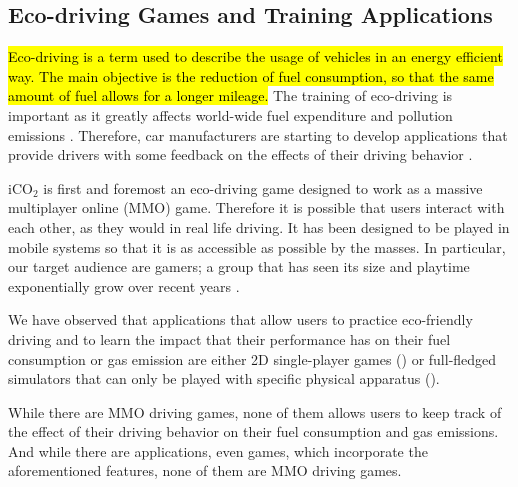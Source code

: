 \documentclass[preprint,authoryear,12pt]{elsarticle}
\newcommand{\hlc}[2][yellow]{ {\sethlcolor{#1} \hl{#2}} }
\newcommand{\commentHidden}[1]{}  %
\newcommand{\commentShow}[1] {} %
\begin{document}
\subsection{Eco-driving Games and Training Applications}
\label{subsec:eco-driving}

\hlc[green]{
Eco-driving is a term used to describe the usage of vehicles in an energy efficient way. The main objective is the reduction of fuel consumption, so that the same amount of fuel allows for a longer mileage.
} \commentShow{Used to describe where ? In this paper ? In some literature ? The placement should be somewhere else.}
The training of eco-driving is important as it greatly affects world-wide fuel expenditure and pollution emissions \citep{barkenbus2010eco,shaheen2012ecodriving}. Therefore, car manufacturers are starting to develop applications that provide drivers with some feedback on the effects of their driving behavior \citep{EcoTools,FiatEcoGame}.

iCO$_2$ is first and foremost an eco-driving game designed to work as a massive multiplayer online (MMO) game. Therefore it is possible that users interact with each other, as they would in real life driving. It has been designed to be played in mobile systems so that it is as  accessible as possible by the masses. In particular, our target audience are gamers; a group that has seen its size and playtime exponentially grow over recent years \citep{MobileStats}.


\commentHidden{It is important to note that the player is not the only one who receives feedback on his or her  driving. Our underlying data gathering system can provide important information to future developers of iCO$_2$ on how to improve the design of the eco-driving simulator.} \commentShow{needs to be re-written.}

\commentHidden{The aforementioned qualities make iCO$_2$ stand out from any other eco-driving application in the industry. } \commentShow{Really ? It's just an opinion, not an academic claim. }
We have observed that applications that allow users to practice eco-friendly driving and to learn the impact that their performance has on their fuel consumption or gas emission are either 2D single-player games (\cite{EcoGame1, EcoGame2, TruckEcoGame, Moebius, FiatEcoGame}) or full-fledged simulators that can only be played with specific physical apparatus (\cite{EcoSimulator, GreenDino, EcoSimulator2, sabrina2013enhanced}). \commentShow{Bad placement}

While there are MMO driving games, none of them allows users to keep track of the effect of their driving behavior on their fuel consumption and gas emissions. And while there are applications, even games, which incorporate the aforementioned features, none of them are MMO driving games.
\end{document}
